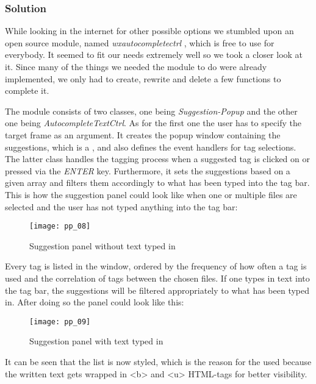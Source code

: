 \subsubsection{Solution}
While looking in the internet for other possible options we stumbled upon an open source module, named \emph{wxautocompletectrl} \cite{autocomplete}, which is free to use for everybody. It seemed to fit our needs extremely well so we took a closer look at it. Since many of the things we needed the module to do were already implemented, we only had to create, rewrite and delete a few functions to complete it. 

The module consists of two classes, one being \textit{Suggestion-Popup} and the other one being \textit{AutocompleteTextCtrl}. As for the first one the user has to specify the target frame as an argument. It creates the popup window containing the suggestions, which is a  \cite{wxhtmllistbox}, and also defines the event handlers for tag selections. The latter class handles the tagging process when a suggested tag is clicked on or pressed via the \textit{ENTER} key. Furthermore, it sets the suggestions based on a given array and filters them accordingly to what has been typed into the tag bar.
This is how the suggestion panel could look like when one or multiple files are selected and the user has not typed anything into the tag bar:

\begin{figure}[H]
    \centering
    \texttt{[image: pp\_08]}
    \caption{Suggestion panel without text typed in}
\end{figure}

Every tag is listed in the window, ordered by the frequency of how often a tag is used and the correlation of tags between the chosen files. If one types in text into the tag bar, the suggestions will be filtered appropriately to what has been typed in. After doing so the panel could look like this:

\begin{figure}[H]
    \centering
    \texttt{[image: pp\_09]}
    \caption{Suggestion panel with text typed in}
\end{figure}

It can be seen that the list is now styled, which is the reason for the used  because the written text gets wrapped in <b> and <u> HTML-tags for better visibility.


